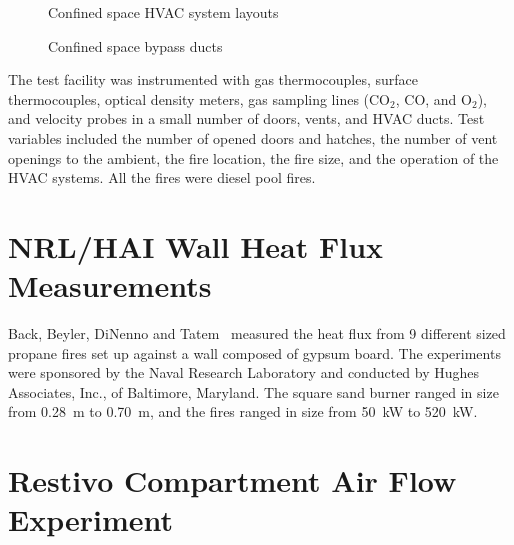 \begin{figure}[ht]
\begin{center}
\end{center}
\caption{Confined space HVAC system layouts}
\label{confined_HVAC}
\end{figure}

\begin{figure}[ht]
\begin{center}
\end{center}
\caption{Confined space bypass ducts}
\label{confined_bypass}
\end{figure}

The test facility was instrumented with gas thermocouples, surface thermocouples, optical density meters, gas sampling lines (CO$_2$, CO, and O$_2$),
and velocity probes in a small number of doors, vents, and HVAC ducts.  Test variables included the number of opened doors and hatches, the number of vent openings to the ambient,
the fire location, the fire size, and the operation of the HVAC systems.  All the fires were diesel pool fires.

\clearpage

\section{NRL/HAI Wall Heat Flux Measurements}

Back, Beyler, DiNenno and Tatem~\cite{Back:IAFSS4} measured the heat flux from 9 different sized propane fires set up against a wall composed
of gypsum board. The experiments were sponsored by the Naval Research Laboratory and conducted by Hughes Associates, Inc., of Baltimore, Maryland. The
square sand burner ranged in size from 0.28~m to 0.70~m, and the fires ranged in size from 50~kW to 520~kW.


\section{Restivo Compartment Air Flow Experiment}

